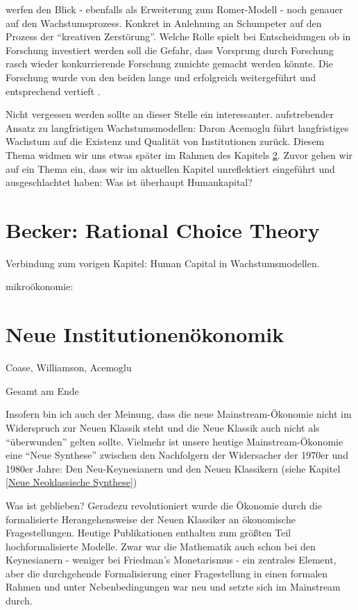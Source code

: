 \textcite{Aghion1992} werfen den Blick - ebenfalls als Erweiterung zum Romer-Modell - noch genauer auf den Wachstumsprozess. Konkret in Anlehnung an Schumpeter auf den Prozess der "`kreativen Zerstörung"'. Welche Rolle spielt bei Entscheidungen ob in Forschung investiert werden soll die Gefahr, dass Vorsprung durch Forschung rasch wieder konkurrierende Forschung zunichte gemacht werden könnte. Die Forschung wurde von den beiden lange und erfolgreich weitergeführt und entsprechend vertieft \parencite{Aghion2005}.

Nicht vergessen werden sollte an dieser Stelle ein interessanter. aufstrebender Ansatz zu langfristigen Wachstumsmodellen: Daron Acemoglu führt langfristiges Wachstum auf die Existenz und Qualität von Institutionen zurück. Diesem Thema widmen wir uns etwas später im Rahmen des Kapitels \ref{sec: Neue Inst}. Zuvor gehen wir auf ein Thema ein, dass wir im aktuellen Kapitel unreflektiert eingeführt und ausgeschlachtet haben: Was ist überhaupt Humankapital?

\section{Becker: Rational Choice Theory}  \label{sec: Becker}

Verbindung zum vorigen Kapitel: Human Capital in Wachstumsmodellen.

mikroökonomie:
\section{Neue Institutionenökonomik} \label{sec: Neue Inst}
Coase, Williamson, Acemoglu
















Gesamt am Ende



Insofern bin ich auch der Meinung, dass die neue Mainstream-Ökonomie nicht im Widerspruch zur Neuen Klassik steht und die Neue Klassik auch nicht als "`überwunden"' gelten sollte. Vielmehr ist unsere heutige Mainstream-Ökonomie eine "`Neue Synthese"' zwischen den Nachfolgern der Widersacher der 1970er und 1980er Jahre: Den Neu-Keynesianern und den Neuen Klassikern (siehe Kapitel \ref{Neue Neoklassische Synthese})


Was ist geblieben? Geradezu revolutioniert wurde die Ökonomie durch die formalisierte Herangehensweise der Neuen Klassiker an ökonomische Fragestellungen. Heutige Publikationen enthalten zum größten Teil hochformalisierte Modelle. Zwar war die Mathematik auch schon bei den Keynesianern - weniger bei Friedman's Monetarismus - ein zentrales Element, aber die durchgehende Formalisierung einer Fragestellung in einen formalen Rahmen und unter Nebenbedingungen war neu und setzte sich im Mainstream durch.


